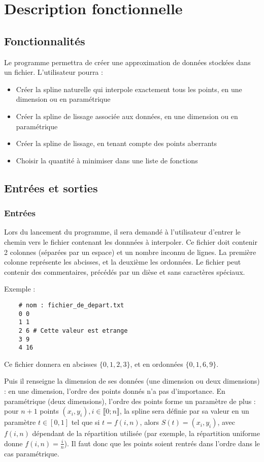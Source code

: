 \documentclass[a4paper,12pt]{article}
\begin{document}
\section{Description fonctionnelle}

\subsection{Fonctionnalités}
\label{Fonctions}

Le programme permettra de créer une approximation de données stockées dans un fichier. L'utilisateur pourra :
\begin{itemize}
\item Créer la spline naturelle qui interpole exactement tous les points, en une dimension ou en paramétrique
\item Créer la spline de lissage associée aux données, en une dimension ou en paramétrique
\item Créer la spline de lissage, en tenant compte des points aberrants
\item Choisir la quantité à minimiser dans une liste de fonctions
\end{itemize}

\newpage
\subsection{Entrées et sorties}

\subsubsection{Entrées}

Lors du lancement du programme, il sera demandé à l'utilisateur d'entrer le chemin vers le fichier contenant les donnnées à interpoler.
Ce fichier doit contenir 2 colonnes (séparées par un espace) et un nombre inconnu de lignes. La première colonne représente les abcisses, et la deuxième les ordonnées. Le fichier peut contenir des commentaires, précédés par un dièse et sans caractères spéciaux.

Exemple :

\begin{lstlisting}
    # nom : fichier_de_depart.txt
    0 0
    1 1
    2 6 # Cette valeur est etrange
    3 9
    4 16
\end{lstlisting}

Ce fichier donnera en abcisses  $\{0,1,2,3\}$, et en ordonnées $\{0,1,6,9\}$.

Puis il renseigne la dimension de ses données (une dimension ou deux dimensions) : en une dimension, l'ordre des points donnés n'a pas d'importance. En paramétrique (deux dimensions), l'ordre des points forme un paramètre de plus : pour $n+1$ points $(x_i,y_i),i\in \llbracket 0; n \rrbracket$, la spline sera définie par sa valeur en un paramètre $t \in [0,1]$ tel que si $t = f(i,n) $, alors $S(t) = (x_i,y_i)$, avec $f(i,n)$ dépendant de la répartition utilisée (par exemple, la répartition uniforme donne $f(i,n) = \frac{i}{n}$). Il faut donc que les points soient rentrés dans l'ordre dans le cas paramétrique.
\end{document}
